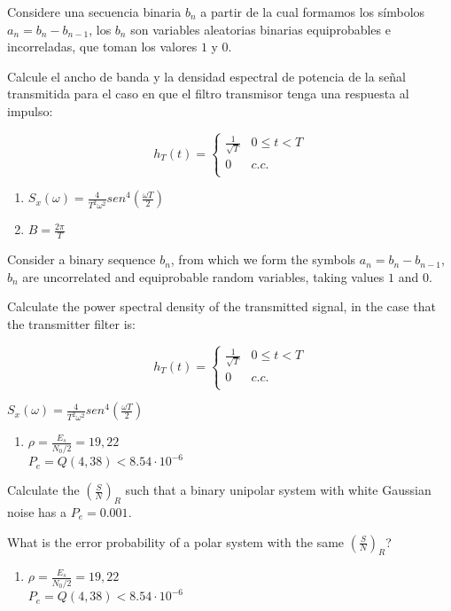 \documentclass[es,boletin]{uah}
\begin{document}
\Problema
{
Considere una secuencia binaria $b_n$ a partir de la cual formamos los símbolos $a_n= b_n - b_{n-1}$, los $b_n$ son variables aleatorias binarias equiprobables e incorreladas, que toman los valores $1$ y $0$. 

Calcule el ancho de banda y la densidad espectral de potencia de la señal transmitida para el caso en que el filtro transmisor tenga una respuesta al impulso:

\begin{displaymath}
	h_T(t) = \left \{ \begin{array}{ll}
		\frac{1}{\sqrt{T}} & 0 \leq t < T \\
		0 & c.c. \\
	\end{array} \right.
\end{displaymath}
}
{
\begin{enumerate}
\item $S_x(\omega) = \frac{4}{T^2 \omega^2} sen^4 \left ( \frac{\omega T}{2} \right )$
\item $B = \frac{2\pi}{T}$
\end{enumerate}
}
{
Consider a binary sequence $b_n$, from which we form the symbols $a_n= b_n - b_{n-1}$, $b_n$ are uncorrelated and equiprobable random variables, taking values $1$ and $0$. 

Calculate the power spectral density of the transmitted signal, in the case that the transmitter filter is:

\begin{displaymath}
	h_T(t) = \left \{ \begin{array}{ll}
		\frac{1}{\sqrt{T}} & 0 \leq t < T \\
		0 & c.c. \\
	\end{array} \right.
\end{displaymath}
}
{
$S_x(\omega) = \frac{4}{T^2 \omega^2} sen^4 \left ( \frac{\omega T}{2} \right )$
}


{
\begin{enumerate}
	\item $\rho = \frac{E_s}{N_0/2} = 19,22$ \\
		$P_e = Q(4,38) < 8.54 \cdot 10^{-6}$
\end{enumerate}
}
{
\cite{Carlson} Calculate the $\left ( \frac{S}{N} \right )_R$ such that a binary unipolar system with white Gaussian noise has a $P_e= 0.001$. 

What is the error probability of a polar system with the same $\left ( \frac{S}{N} \right )_R$?
}
{
\begin{enumerate}
	\item $\rho = \frac{E_s}{N_0/2} = 19,22$ \\
		$P_e = Q(4,38) < 8.54 \cdot 10^{-6}$
\end{enumerate}
}
\end{document}

